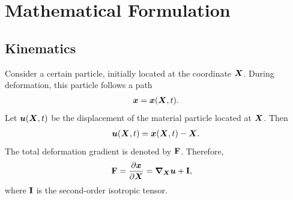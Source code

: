 \chapter{Mathematical Formulation}

\section{Kinematics}
Consider a certain particle, initially located at the coordinate ${\bm{X}}$. During deformation, this particle follows a path 
\begin{gather}
{\bm{x}} = {\bm{x}}({\bm{X}},t).
\end{gather}
Let ${\bm{u}}({\bm{X}}, t)$ be the displacement of the material particle located at ${\bm{X}}$. Then
\begin{gather}
   {\bm{u}}({\bm{X}}, t) = {\bm{x}}({\bm{X}}, t) - {\bm{X}}.
\end{gather}
The total deformation gradient is denoted by $\mathbf{F}$. Therefore, 
\begin{align}
    \mathbf{F} &= \frac{\partial {\bm{x}}}{\partial {\bm{X}}} = \bm{\nabla}_{\bm{X}} {\bm{u}} + \mathbf{I}, 
\end{align} 
where $\mathbf{I}$ is the second-order isotropic tensor.

